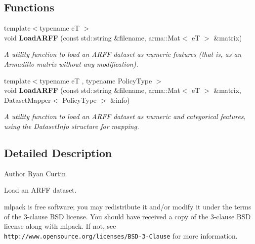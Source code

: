\subsection*{Functions}
\begin{DoxyCompactItemize}
\item 
{\footnotesize template$<$typename eT $>$ }\\void \textbf{ Load\+A\+R\+FF} (const std\+::string \&filename, arma\+::\+Mat$<$ eT $>$ \&matrix)
\begin{DoxyCompactList}\small\item\em A utility function to load an A\+R\+FF dataset as numeric features (that is, as an Armadillo matrix without any modification). \end{DoxyCompactList}\item 
{\footnotesize template$<$typename eT , typename Policy\+Type $>$ }\\void \textbf{ Load\+A\+R\+FF} (const std\+::string \&filename, arma\+::\+Mat$<$ eT $>$ \&matrix, Dataset\+Mapper$<$ Policy\+Type $>$ \&info)
\begin{DoxyCompactList}\small\item\em A utility function to load an A\+R\+FF dataset as numeric and categorical features, using the Dataset\+Info structure for mapping. \end{DoxyCompactList}\end{DoxyCompactItemize}


\subsection{Detailed Description}
\begin{DoxyAuthor}{Author}
Ryan Curtin
\end{DoxyAuthor}
Load an A\+R\+FF dataset.

mlpack is free software; you may redistribute it and/or modify it under the terms of the 3-\/clause B\+SD license. You should have received a copy of the 3-\/clause B\+SD license along with mlpack. If not, see {\tt http\+://www.\+opensource.\+org/licenses/\+B\+S\+D-\/3-\/\+Clause} for more information. 